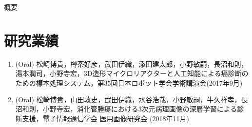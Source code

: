 \documentclass[12pt, twoside,openright,a4paper,papersize,uplatex,dvipdfmx, report]{jsbook}
\begin{document}


\frontmatter



\begin{center}
  {\large \sf 概要}
\end{center}



\tableofcontents
\listoffigures
\listoftables

\mainmatter


\renewcommand{\bibname}{引用文献}
%

%

\label{page:bib}


\chapter*{研究業績}
\begin{enumerate}
	\item (Oral) 松崎博貴，樽茶好彦，武田伊織，添田建太郎，小野敏嗣，長沼和則，湯本潤司，小野寺宏，3D造形マイクロリアクターと人工知能による癌診断のための標本処理システム，第35回日本ロボット学会学術講演会(2017年9月)
	\item  (Oral) 松崎博貴，山田敦史，武田伊織，水谷浩哉，小野敏嗣，牛久祥孝，長沼和則，小野寺宏，消化管腫瘍における3次元病理画像の深層学習による診断支援，電子情報通信学会 医用画像研究会 (2018年11月)
\end{enumerate}
\end{document}
